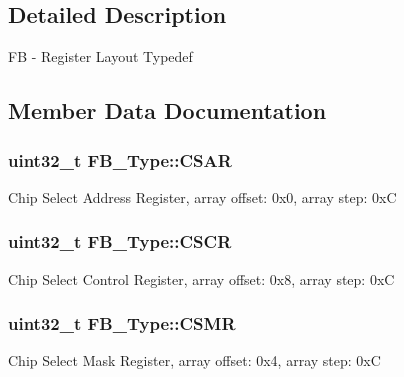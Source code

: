 \begin{DoxyCompactItemize}
\begin{tabbing}
\end{tabbing}\end{DoxyCompactItemize}


\subsection{Detailed Description}
FB -\/ Register Layout Typedef 

\subsection{Member Data Documentation}
\subsubsection[{\texorpdfstring{C\+S\+AR}{CSAR}}]{ uint32\+\_\+t F\+B\+\_\+\+Type\+::\+C\+S\+AR}\hypertarget{structFB__Type_abb1101b4dcb8c9dd9f75275f0dd3ab81}{}\label{structFB__Type_abb1101b4dcb8c9dd9f75275f0dd3ab81}
Chip Select Address Register, array offset\+: 0x0, array step\+: 0xC 
\subsubsection[{\texorpdfstring{C\+S\+CR}{CSCR}}]{ uint32\+\_\+t F\+B\+\_\+\+Type\+::\+C\+S\+CR}\hypertarget{structFB__Type_a61b62c31da70f4173f0b4ef38aae0489}{}\label{structFB__Type_a61b62c31da70f4173f0b4ef38aae0489}
Chip Select Control Register, array offset\+: 0x8, array step\+: 0xC 
\subsubsection[{\texorpdfstring{C\+S\+MR}{CSMR}}]{ uint32\+\_\+t F\+B\+\_\+\+Type\+::\+C\+S\+MR}\hypertarget{structFB__Type_a8af43e05c8447e8a22812399362ec578}{}\label{structFB__Type_a8af43e05c8447e8a22812399362ec578}
Chip Select Mask Register, array offset\+: 0x4, array step\+: 0xC 
